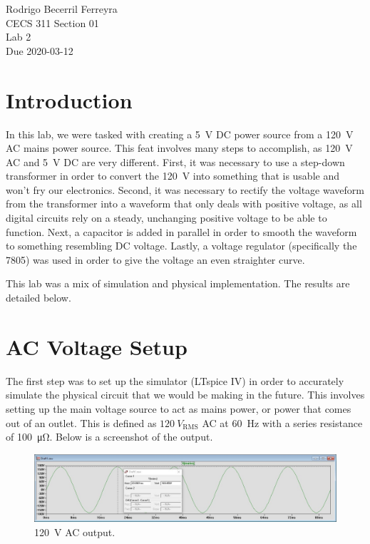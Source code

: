 \documentclass{article}
\begin{document}
\begin{flushright}
    \noindent
    Rodrigo Becerril Ferreyra\\
    CECS 311 Section 01\\
    Lab 2\\
    Due 2020-03-12
\end{flushright}

\section*{Introduction} In this lab, we were tasked with creating
a \SI{5}{V} DC power source from a \SI{120}{V} AC mains power
source. This feat involves many steps to accomplish, as
\SI{120}{V} AC and \SI{5}{V} DC are very different. First,
it was necessary to use a step-down transformer in order to
convert the \SI{120}{V} into something that is usable and
won't fry our electronics. Second, it was necessary to
rectify the voltage waveform from the transformer into a
waveform that only deals with positive voltage, as all digital
circuits rely on a steady, unchanging positive voltage to be
able to function. Next, a capacitor is added in parallel in order
to smooth the waveform to something resembling DC voltage.
Lastly, a voltage regulator (specifically the 7805) was used
in order to give the voltage an even straighter curve.

This lab was a mix of simulation and physical implementation.
The results are detailed below.

\section{AC Voltage Setup} The first step was to set up the
simulator (LTspice IV) in order to accurately simulate the
physical circuit that we would be making in the future. This
involves setting up the main voltage source to act as mains
power, or power that comes out of an outlet. This is defined
as \(\SI{120}{V}_\text{RMS}\) AC at \SI{60}{\hertz} with a series
resistance of \SI{100}{\micro\ohm}. Below is a screenshot of
the output.

\begin{figure}[h]
    \centering
    \includegraphics[width=\textwidth]{Images/ACPower.jpg}
    \caption{\SI{120}{V} AC output.}
    \label{fig1}
\end{figure}
\end{document}
